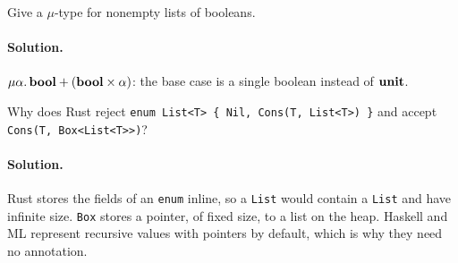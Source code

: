 \begin{exercise}
Give a $\mu$-type for nonempty lists of booleans.
\end{exercise}

\paragraph{Solution.} $\mu\alpha.\, \mathbf{bool} + (\mathbf{bool} \times \alpha)$: the base case is a single
boolean instead of $\mathbf{unit}$.

\begin{exercise}
Why does Rust reject \texttt{enum List<T> \{ Nil, Cons(T, List<T>) \}} and
accept \texttt{Cons(T, Box<List<T>>)}?
\end{exercise}

\paragraph{Solution.} Rust stores the fields of an \texttt{enum} inline, so a
\texttt{List} would contain a \texttt{List} and have infinite size.
\texttt{Box} stores a pointer, of fixed size, to a list on the heap. Haskell
and ML represent recursive values with pointers by default, which is why
they need no annotation.
